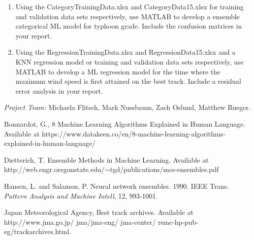 \documentclass{SBCbookchapter}
\begin{document}
\begin{enumerate}
 \item Using the CategoryTrainingData.xlsx and CategoryData15.xlsx for training and validation data sets respectively, use MATLAB to develop a ensemble categorical ML model for typhoon grade. Include the confusion matrices in your report. 
 \item Using the RegressionTrainingData.xlsx and RegressionData15.xlsx and a KNN regression model or training and validation data sets respectively, use MATLAB to develop  a ML regression model for the time where the maximum wind speed is first attained on the best track. Include a residual error analysis in your report.
\end{enumerate}

\emph{Project Team:} Michaela Flitsch, Mark Nussbaum, Zach Oslund, Matthew Rueger.

\newpage
 \begin{thebibliography}{9}

   {Bonnardot, G.}, 8 Machine Learning Algorithms Explained in Human Language. Available at https://www.datakeen.co/en/8-machine-learning-algorithms-explained-in-human-language/
 
  {Dietterich, T.} Ensemble Methods in Machine Learning.  Available at http://web.engr.oregonstate.edu/$\sim$tgd/publications/mcs-ensembles.pdf
 
  {Hansen, L. and Salamon, P.} Neural network ensembles. 1990. IEEE Trans. \emph{Pattern Analysis and Machine Intell}, 12, 993-1001.
 
 {Japan Meteorological Agency},  Best track archives. Available at  http://www.jma.go.jp/ jma/jma-eng/ jma-center/ rsmc-hp-pub-eg/trackarchives.html.

\end{thebibliography}
\end{document}
